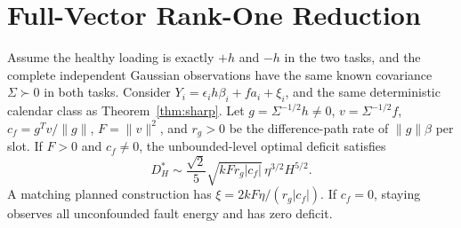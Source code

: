 \section{Full-Vector Rank-One Reduction}\label{app:rankone}
\begin{proposition}\label{prop:rankone}
Assume the healthy loading is exactly $+h$ and $-h$ in the two tasks, and the complete independent Gaussian observations have the same known covariance $\Sigma\succ0$ in both tasks. Consider
$Y_i=\epsilon_i h\beta_i+fa_i+\xi_i$, and the same deterministic calendar class as Theorem~\ref{thm:sharp}. Let $g=\Sigma^{-1/2}h\ne0$, $v=\Sigma^{-1/2}f$, $c_f=g^Tv/\|g\|$, $F=\|v\|^2$, and $r_g>0$ be the difference-path rate of $\|g\|\beta$ per slot. If $F>0$ and $c_f\ne0$, the unbounded-level optimal deficit satisfies
\begin{equation}
 D_H^*\sim\frac{\sqrt2}{5}\sqrt{kF r_g|c_f|}\,\eta^{3/2}H^{5/2}.\label{eq:rankone}
\end{equation}
A matching planned construction has $\xi=2kF\eta/(r_g|c_f|)$. If $c_f=0$, staying observes all unconfounded fault energy and has zero deficit.
\end{proposition}
